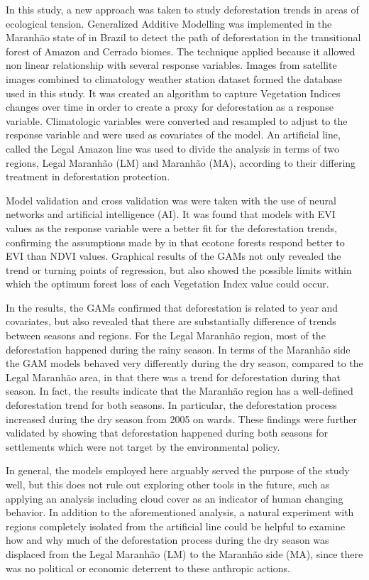 In this study, a new approach was taken to study deforestation trends in areas of ecological tension. Generalized Additive Modelling was implemented in the Maranhão state of in Brazil to detect the path of deforestation in the transitional forest of Amazon and Cerrado biomes. The technique applied because it allowed non linear relationship with several response variables. Images from satellite images combined to climatology weather station dataset formed the database used in this study. It was created an algorithm to capture Vegetation Indices changes over time in order to create a proxy for deforestation as a response variable. Climatologic variables were converted and resampled to adjust to the response variable and were used as covariates of the model. An artificial line, called the Legal Amazon line was used to divide the analysis in terms of two regions, Legal Maranhão (LM) and Maranhão (MA), according to their differing treatment in deforestation protection.  

Model validation and cross validation was were taken with the use of neural networks and artificial intelligence (AI). It was found that models with EVI values as the response variable were a better fit for the deforestation trends, confirming the assumptions made by \citet{ratana_huete_ferreira_2005,bayma_sano_2015,didan_munoz_2015} in that ecotone forests respond better to EVI than NDVI values. Graphical results of the GAMs not only revealed the trend or turning points of regression, but also showed the possible limits within which the optimum forest loss of each Vegetation Index value could occur. 

In the results, the GAMs confirmed that deforestation is related to year and covariates, but also revealed that there are substantially difference of trends between seasons and regions. For the Legal Maranhão region, most of the deforestation happened during the rainy season. In terms of the Maranhão side the GAM models behaved very differently during the dry season, compared to the Legal Maranhão area, in that there was a trend for deforestation during that season. In fact, the results indicate that the Maranhão region has a well-defined deforestation trend for both seasons. In particular, the deforestation process increased during the dry season from 2005 on wards. These findings were further validated by showing that deforestation happened during both seasons for settlements which were not target by the environmental policy.

In general, the models employed here arguably served the purpose of the study well, but this does not rule out exploring other tools in the future, such as applying an analysis including cloud cover as an indicator of human changing behavior. In addition to the aforementioned analysis, a natural experiment with regions completely isolated from the artificial line could be helpful to examine how and why much of the deforestation process during the dry season was displaced from the Legal Maranhão (LM) to the Maranhão side (MA), since there was no political or economic deterrent to these anthropic actions. 

